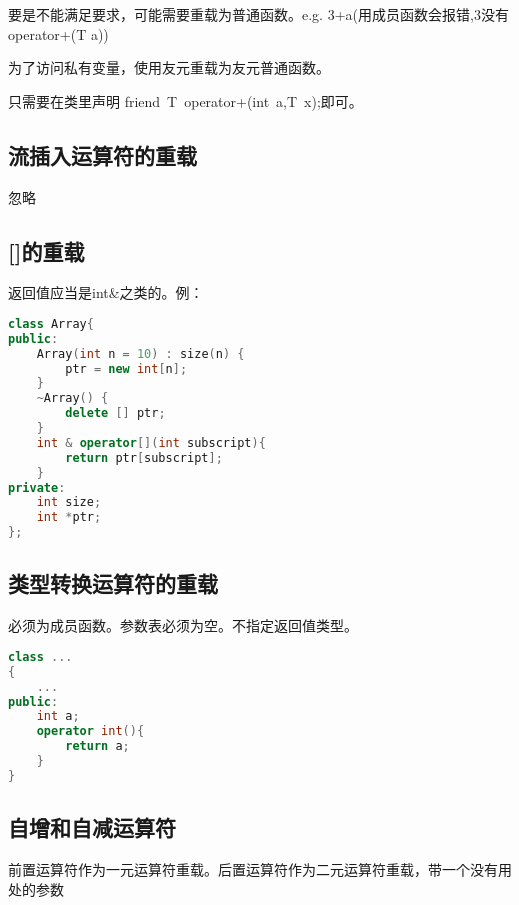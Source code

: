 \documentclass[UTF8]{ctexart}
\begin{document}
要是不能满足要求，可能需要重载为普通函数。e.g. 3+a(用成员函数会报错,3没有operator+(T a))

为了访问私有变量，使用友元重载为友元普通函数。

只需要在类里声明 friend\ T\ operator+(int\ a,T\ x);即可。

\subsection{流插入运算符的重载}忽略

\subsection{[]的重载}
返回值应当是int\&之类的。例：
\begin{lstlisting}[language=C++]
class Array{
public:
	Array(int n = 10) : size(n) {
		ptr = new int[n];
	}
	~Array() {
		delete [] ptr;
	}
	int & operator[](int subscript){
		return ptr[subscript];
	}
private:
	int size;
	int *ptr;
};
\end{lstlisting}

\subsection{类型转换运算符的重载}
必须为成员函数。参数表必须为空。不指定返回值类型。
\begin{lstlisting}[language=C++]
class ...
{
	...
public:
	int a;
	operator int(){
		return a;
	}
}
\end{lstlisting}

\subsection{自增和自减运算符}
前置运算符作为一元运算符重载。后置运算符作为二元运算符重载，带一个没有用处的参数
\end{document}
